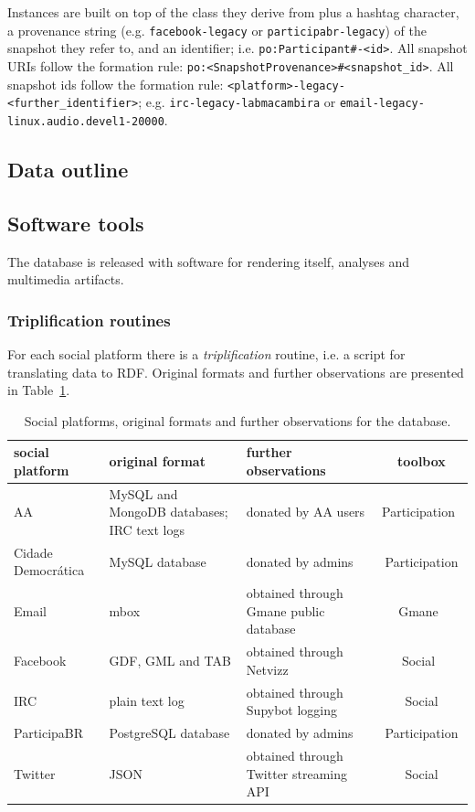 \documentclass[review]{elsarticle}
\newcommand{\textttt}[1] {\texttt{\footnotesize#1}}
\begin{document}
Instances are built on top of the class they derive from plus a hashtag character,
a provenance string (e.g. \textttt{facebook-legacy} or
\textttt{participabr-legacy}) of the snapshot they refer to, and an identifier;
i.e. \textttt{po:Participant\#<provenance-legacy>-<id>}.
All snapshot URIs follow the formation rule: \textttt{po:<SnapshotProvenance>\#<snapshot\_id>}.
All snapshot ids follow the formation rule: \textttt{<platform>-legacy-<further\_identifier>}; e.g.
\textttt{irc-legacy-labmacambira} or
\textttt{email-legacy-linux.audio.devel1-20000}.

\subsection{Data outline}




\subsection{Software tools}
The database is released with software for rendering itself, analyses and
multimedia artifacts.
\subsubsection{Triplification routines}
For each social platform there is a \emph{triplification} routine,
i.e. a script for translating data to RDF.
Original formats and further observations are presented in
Table~\ref{tab:provenance}.
\begin{table}[h!]\scriptsize
\begin{center}
\caption{Social platforms, original formats and further observations for
the database.}\label{tab:provenance}
\begin{tabular}{| l || p{3cm} | p{3cm} | c |}\hline
    \textbf{social platform} & \textbf{original format} & \textbf{further observations} & \textbf{toolbox} \\\hline\hline
    AA & MySQL and MongoDB databases; IRC text logs & donated by AA users & Participation~\cite{participation} \\\hline
    Cidade Democrática & MySQL database & donated by admins & Participation \\\hline
    Email & mbox & obtained through Gmane public database & Gmane~\cite{gmane} \\\hline
    Facebook & GDF, GML and TAB & obtained through Netvizz~\cite{netvizz} & Social~\cite{social} \\\hline
    IRC & plain text log & obtained through Supybot logging & Social \\\hline
    ParticipaBR & PostgreSQL database & donated by admins & Participation \\\hline
    Twitter & JSON & obtained through Twitter streaming API & Social \\\hline
\end{tabular}\end{center}
\end{table}                    
\end{document}
